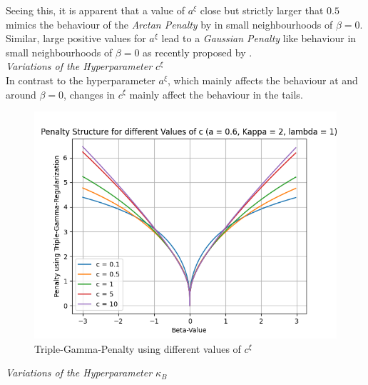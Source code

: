 \documentclass[12pt,a4paper]{article}
\begin{document}
Seeing this, it is apparent that a value of $a^\xi$ close but strictly larger that $0.5$ mimics the behaviour of the \textit{Arctan Penalty} by \textcite{WangZhu2016} in small neighbourhoods of $\beta=0$. Similar, large positive values for $a^\xi$ lead to a \textit{Gaussian Penalty} like behaviour in small neighbourhoods of $\beta = 0$ as recently proposed by \textcite{JohnVettamWu2022}.\\

\textit{Variations of the Hyperparameter $c^\xi$}\\

In contrast to the hyperparameter $a^\xi$, which mainly affects the behaviour at and around $\beta=0$, changes in $c^\xi$ mainly affect the behaviour in the tails.

\begin{figure}[!h]
\centering
\includegraphics[scale=0.75]{../02_simulation/021_simulation_figures/TGPenalty_ChangeInC.png}
\caption{Triple-Gamma-Penalty using different values of $c^\xi$}
\label{fig:basicTGPen}
\end{figure}

\textit{Variations of the Hyperparameter $\kappa_B$}\\
\end{document}
